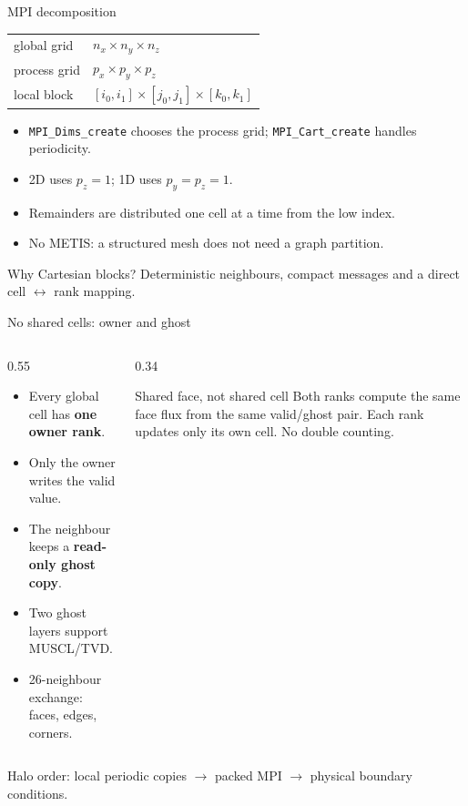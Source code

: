\documentclass[aspectratio=169,10pt]{beamer}
\begin{document}
\begin{frame}{MPI decomposition}
  \begin{center}
    \small
    \begin{tabular}{ll}
      \toprule
      global grid & $n_x \times n_y \times n_z$ \\
      process grid & $p_x \times p_y \times p_z$ \\
      local block & $[i_0,i_1]\times[j_0,j_1]\times[k_0,k_1]$ \\
      \bottomrule
    \end{tabular}
  \end{center}

  \begin{itemize}
    \item \texttt{MPI\_Dims\_create} chooses the process grid;
          \texttt{MPI\_Cart\_create} handles periodicity.
    \item 2D uses $p_z=1$; 1D uses $p_y=p_z=1$.
    \item Remainders are distributed one cell at a time from the low index.
    \item No METIS: a structured mesh does not need a graph partition.
  \end{itemize}

  \begin{block}{Why Cartesian blocks?}
    Deterministic neighbours, compact messages and a direct
    cell $\leftrightarrow$ rank mapping.
  \end{block}
\end{frame}

\begin{frame}{No shared cells: owner and ghost}
  \begin{columns}[T]
    \begin{column}{0.55\textwidth}
      \begin{itemize}
        \item Every global cell has \textbf{one owner rank}.
        \item Only the owner writes the valid value.
        \item The neighbour keeps a \textbf{read-only ghost copy}.
        \item Two ghost layers support MUSCL/TVD.
        \item 26-neighbour exchange: faces, edges, corners.
      \end{itemize}
    \end{column}
    \begin{column}{0.34\textwidth}
      \begin{block}{Shared face, not shared cell}
        Both ranks compute the same face flux from the same valid/ghost pair.
        Each rank updates only its own cell. No double counting.
      \end{block}
    \end{column}
  \end{columns}

  \vspace{0.8em}
  \small
  Halo order: local periodic copies $\rightarrow$ packed MPI $\rightarrow$
  physical boundary conditions.
\end{frame}
\end{document}
